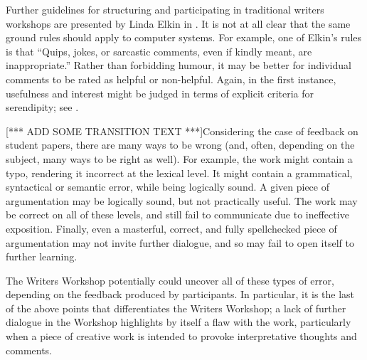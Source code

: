 Further guidelines for structuring and participating in traditional
writers workshops are presented by Linda Elkin in
\cite[pp. 201--203]{gabriel2002writer}.  It is not at all clear that
the same ground rules should apply to computer systems.  For example,
one of Elkin's rules is that ``Quips, jokes, or sarcastic comments,
even if kindly meant, are inappropriate.''  Rather than forbidding
humour, it may be better for individual comments to be rated as
helpful or non-helpful.  Again, in the first instance, usefulness
and interest might be judged in terms of explicit criteria for serendipity;
see \cite{corneli15cc,pease2013discussion}.

[*** ADD SOME TRANSITION TEXT ***]Considering the case of feedback on student papers, there are many ways to be wrong (and, often, depending on the subject, many ways to be right as well).  
For example, the work might contain a typo, rendering it incorrect at the lexical level.  It might contain a grammatical, syntactical or semantic error, while being logically sound.  A given piece of argumentation may be logically sound, but not practically useful.   The work may be correct on all of these levels, and still fail to communicate due to ineffective exposition.  Finally, even a masterful, correct, and fully spellchecked piece of argumentation may not invite further dialogue, and so may fail to open itself to further learning.

The Writers Workshop potentially could uncover all of these types of error, depending on the feedback produced by participants. In particular, it is the last of the above points that differentiates the Writers Workshop; a lack of further dialogue in the Workshop highlights by itself a flaw with the work, particularly when a piece of creative work is intended to provoke interpretative thoughts and comments. 







\bigskip




